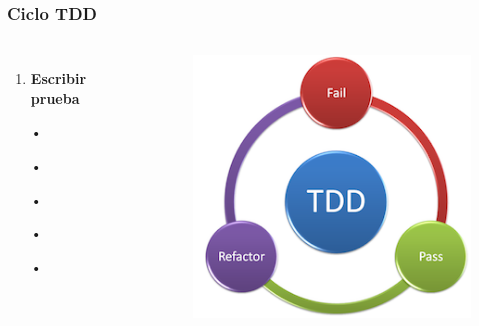 \documentclass{beamer}
\begin{document}
\begin{frame}
\frametitle{Ciclo TDD}
\begin{columns}[c] %

\begin{enumerate}
\item \textbf{Escribir prueba}
\item[•]	
\item[•]	
\item[•]	
\item[•]	
\item[•]	
\end{enumerate}

\begin{figure}
\includegraphics[width=0.9\linewidth]{tdd.png}
\end{figure}
\end{columns}
\end{frame}

\end{document}
